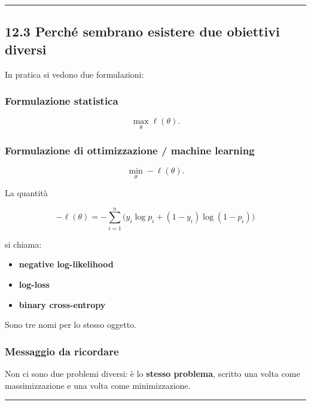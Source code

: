 \documentclass{article}
\providecommand{\tightlist}{%
  \setlength{\itemsep}{0pt}\setlength{\parskip}{0pt}}
\begin{document}
\begin{center}\rule{0.5\linewidth}{0.5pt}\end{center}

\subsection{12.3 Perché sembrano esistere due obiettivi
diversi}\label{perchuxe9-sembrano-esistere-due-obiettivi-diversi}

In pratica si vedono due formulazioni:

\subsubsection{Formulazione statistica}\label{formulazione-statistica}

\[
\max_\theta \ell(\theta).
\]

\subsubsection{Formulazione di ottimizzazione / machine
learning}\label{formulazione-di-ottimizzazione-machine-learning}

\[
\min_\theta -\ell(\theta).
\]

La quantità

\[
-\ell(\theta)
=
-\sum_{i=1}^n \Big(y_i\log p_i + (1-y_i)\log(1-p_i)\Big)
\]

si chiama:

\begin{itemize}
\tightlist
\item
  \textbf{negative log-likelihood}
\item
  \textbf{log-loss}
\item
  \textbf{binary cross-entropy}
\end{itemize}

Sono tre nomi per lo stesso oggetto.

\subsubsection{Messaggio da ricordare}\label{messaggio-da-ricordare}

Non ci sono due problemi diversi: è lo \textbf{stesso problema}, scritto
una volta come massimizzazione e una volta come minimizzazione.

\begin{center}\rule{0.5\linewidth}{0.5pt}\end{center}
\end{document}
